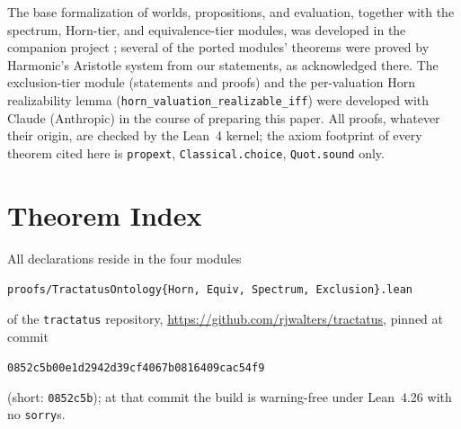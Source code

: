 \documentclass[10pt, letterpaper]{article}
\theoremstyle{remark}
\newcommand{\lean}[1]{\texttt{#1}}
\begin{document}
The base formalization of worlds, propositions, and evaluation, together with
the spectrum, Horn-tier, and equivalence-tier modules, was developed in the
companion project \cite{companion2026}; several of the ported modules'
theorems were proved by Harmonic's Aristotle system from our statements, as
acknowledged there. The exclusion-tier module (statements and proofs) and
the per-valuation Horn realizability lemma
(\lean{horn\_valuation\_realizable\_iff}) were
developed with Claude (Anthropic) in the course of preparing this paper. All
proofs, whatever their origin, are checked by the Lean~4 kernel; the axiom
footprint of every theorem cited here is \lean{propext},
\lean{Classical.choice}, \lean{Quot.sound} only.

\appendix

\section{Theorem Index}\label{app:index}

All declarations reside in the four modules
\begin{center}
\lean{proofs/TractatusOntology\{Horn,\,Equiv,\,Spectrum,\,Exclusion\}.lean}
\end{center}
of the \lean{tractatus} repository,
\url{https://github.com/rjwalters/tractatus}, pinned at commit
\begin{center}
\lean{0852c5b00e1d2942d39cf4067b0816409cac54f9}
\end{center}
(short: \lean{0852c5b}); at that commit the build is warning-free under
Lean~4.26 with no \lean{sorry}s.
\end{document}
